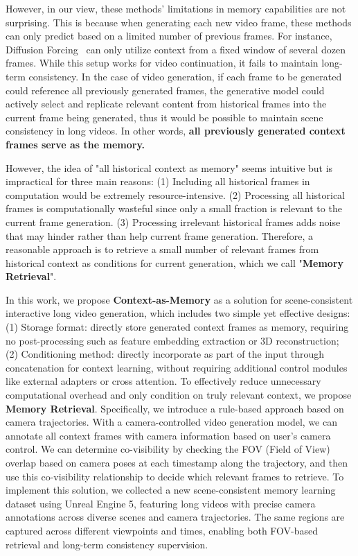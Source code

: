 However, in our view, these methods' limitations in memory capabilities are not surprising. This is because when generating each new video frame, these methods can only predict based on a limited number of previous frames. For instance, Diffusion Forcing~\cite{cdf, dfot} can only utilize context from a fixed window of several dozen frames. While this setup works for video continuation, it fails to maintain long-term consistency. 
In the case of video generation, if each frame to be generated could reference all previously generated frames, the generative model could actively select and replicate relevant content from historical frames into the current frame being generated, thus it would be possible to maintain scene consistency in long videos. In other words, \textbf{all previously generated context frames serve as the memory.}

However, the idea of "all historical context as memory" seems intuitive but is impractical for three main reasons:
(1) Including all historical frames in computation would be extremely resource-intensive. 
(2) Processing all historical frames is computationally wasteful since only a small fraction is relevant to the current frame generation.
(3) Processing irrelevant historical frames adds noise that may hinder rather than help current frame generation.
Therefore, a reasonable approach is to retrieve a small number of relevant frames from historical context as conditions for current generation, which we call "\textbf{Memory Retrieval}".

In this work, we propose \textbf{Context-as-Memory} as a solution for scene-consistent interactive long video generation, which includes two simple yet effective designs: (1) Storage format: directly store generated context frames as memory, requiring no post-processing such as feature embedding extraction or 3D reconstruction; (2) Conditioning method: directly incorporate as part of the input through concatenation for context learning, without requiring additional control modules like external adapters or cross attention.
To effectively reduce unnecessary computational overhead and only condition on truly relevant context, we propose \textbf{Memory Retrieval}. Specifically, we introduce a rule-based approach based on camera trajectories. With a camera-controlled video generation model, we can annotate all context frames with camera information based on user's camera control. We can determine co-visibility by checking the FOV (Field of View) overlap based on camera poses at each timestamp along the trajectory, and then use this co-visibility relationship to decide which relevant frames to retrieve.
To implement this solution, we collected a new scene-consistent memory learning dataset using Unreal Engine 5, featuring long videos with precise camera annotations across diverse scenes and camera trajectories. The same regions are captured across different viewpoints and times, enabling both FOV-based retrieval and long-term consistency supervision.

